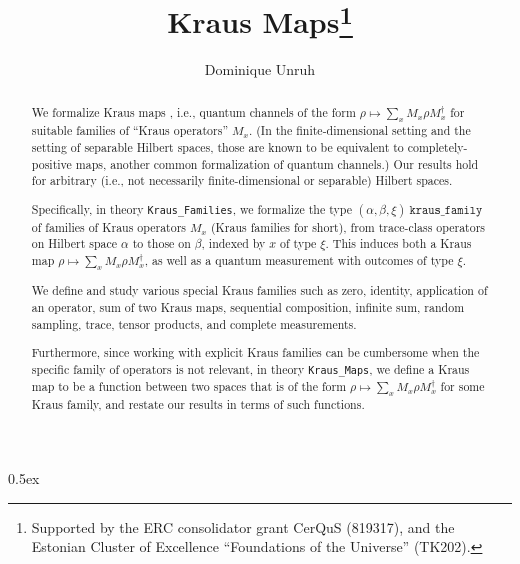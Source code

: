 \documentclass[11pt,a4paper]{article}
\begin{document}
\title{Kraus Maps\thanks{Supported by the ERC consolidator grant CerQuS (819317), and the Estonian Cluster of Excellence ``Foundations of the Universe'' (TK202).}}
\author{Dominique Unruh}
\maketitle

\begin{abstract}
  We formalize Kraus maps \cite[Section 3]{kraus}, i.e., quantum channels of the form $\rho\mapsto\sum_x M_x\rho M_x^\dagger$ for suitable families of ``Kraus operators'' $M_x$.
  (In the finite-dimensional setting and the setting of separable Hilbert spaces,
  those are known to be equivalent to completely-positive maps, another common formalization of quantum channels.)
  Our results hold for arbitrary (i.e., not necessarily finite-dimensional or separable) Hilbert spaces.

  Specifically, in theory \texttt{Kraus\_Families}, we formalize the type $(\alpha,\beta,\xi)\ \mathtt{kraus\_family}$ of families of Kraus operators $M_x$ (Kraus families for short),
  from trace-class operators on Hilbert space $\alpha$ to those on $\beta$, indexed by $x$ of type $\xi$.
  This induces both a Kraus map $\rho\mapsto\sum_x M_x\rho M_x^\dagger$, as well as a quantum measurement with outcomes of type $\xi$.

  We define and study various special Kraus families such as zero,
  identity, application of an operator, sum of two Kraus maps,
  sequential composition, infinite sum, random sampling, trace, tensor
  products, and complete measurements.

  Furthermore, since working with explicit Kraus families can be
  cumbersome when the specific family of operators is not relevant, in
  theory \texttt{Kraus\_Maps}, we define a Kraus map to be a function
  between two spaces that is of the form
  $\rho\mapsto\sum_x M_x\rho M_x^\dagger$ for some Kraus family, and
  restate our results in terms of such functions.  
\end{abstract}

\tableofcontents

\parindent 0pt\parskip 0.5ex





\end{document}
